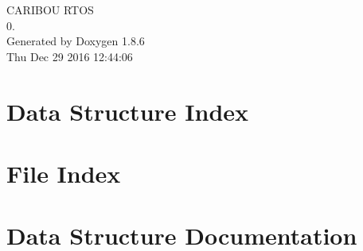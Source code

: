 \documentclass[twoside]{book}
\newcommand{\clearemptydoublepage}{%
  \newpage{\pagestyle{empty}\cleardoublepage}%
}
\begin{document}
\hypersetup{pageanchor=false}
\begin{titlepage}
\vspace*{7cm}
\begin{center}%
{\Large C\-A\-R\-I\-B\-O\-U R\-T\-O\-S \\[1ex]\large 0. }\\
\vspace*{1cm}
{\large Generated by Doxygen 1.8.6}\\
\vspace*{0.5cm}
{\small Thu Dec 29 2016 12:44:06}\\
\end{center}
\end{titlepage}
\clearemptydoublepage
\tableofcontents
\clearemptydoublepage
{}
\hypersetup{pageanchor=true}

\chapter{Data Structure Index}

\chapter{File Index}

\chapter{Data Structure Documentation}





















\end{document}
